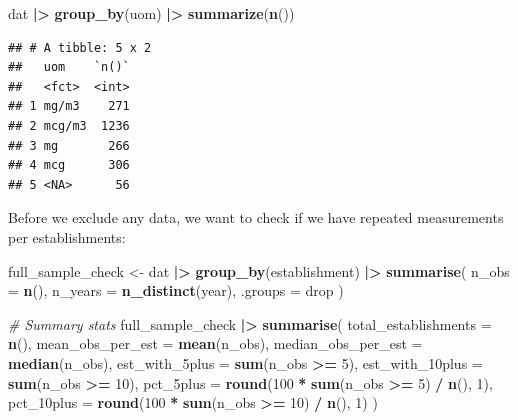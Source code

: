 \documentclass[
]{article}
\newenvironment{Shaded}{\begin{snugshade}}{\end{snugshade}}
\newcommand{\AttributeTok}[1]{\textcolor[rgb]{0.13,0.29,0.53}{#1}}
\newcommand{\CommentTok}[1]{\textcolor[rgb]{0.56,0.35,0.01}{\textit{#1}}}
\newcommand{\DecValTok}[1]{\textcolor[rgb]{0.00,0.00,0.81}{#1}}
\newcommand{\FunctionTok}[1]{\textcolor[rgb]{0.13,0.29,0.53}{\textbf{#1}}}
\newcommand{\NormalTok}[1]{#1}
\newcommand{\OtherTok}[1]{\textcolor[rgb]{0.56,0.35,0.01}{#1}}
\newcommand{\SpecialCharTok}[1]{\textcolor[rgb]{0.81,0.36,0.00}{\textbf{#1}}}
\newcommand{\StringTok}[1]{\textcolor[rgb]{0.31,0.60,0.02}{#1}}
\begin{document}
\begin{Shaded}
\begin{Highlighting}[]
\NormalTok{dat }\SpecialCharTok{|\textgreater{}} 
  \FunctionTok{group\_by}\NormalTok{(uom) }\SpecialCharTok{|\textgreater{}} 
  \FunctionTok{summarize}\NormalTok{(}\FunctionTok{n}\NormalTok{())}
\end{Highlighting}
\end{Shaded}

\begin{verbatim}
## # A tibble: 5 x 2
##   uom    `n()`
##   <fct>  <int>
## 1 mg/m3    271
## 2 mcg/m3  1236
## 3 mg       266
## 4 mcg      306
## 5 <NA>      56
\end{verbatim}

Before we exclude any data, we want to check if we have repeated
measurements per establishments:

\begin{Shaded}
\begin{Highlighting}[]
\NormalTok{ full\_sample\_check }\OtherTok{\textless{}{-}}\NormalTok{ dat }\SpecialCharTok{|\textgreater{}}
  \FunctionTok{group\_by}\NormalTok{(establishment) }\SpecialCharTok{|\textgreater{}}
  \FunctionTok{summarise}\NormalTok{(}
    \AttributeTok{n\_obs =} \FunctionTok{n}\NormalTok{(),}
    \AttributeTok{n\_years =} \FunctionTok{n\_distinct}\NormalTok{(year),}
    \AttributeTok{.groups =} \StringTok{\textquotesingle{}drop\textquotesingle{}}
\NormalTok{  )}

\CommentTok{\# Summary stats}
\NormalTok{full\_sample\_check }\SpecialCharTok{|\textgreater{}}
  \FunctionTok{summarise}\NormalTok{(}
    \AttributeTok{total\_establishments =} \FunctionTok{n}\NormalTok{(),}
    \AttributeTok{mean\_obs\_per\_est =} \FunctionTok{mean}\NormalTok{(n\_obs),}
    \AttributeTok{median\_obs\_per\_est =} \FunctionTok{median}\NormalTok{(n\_obs),}
    \AttributeTok{est\_with\_5plus =} \FunctionTok{sum}\NormalTok{(n\_obs }\SpecialCharTok{\textgreater{}=} \DecValTok{5}\NormalTok{),}
    \AttributeTok{est\_with\_10plus =} \FunctionTok{sum}\NormalTok{(n\_obs }\SpecialCharTok{\textgreater{}=} \DecValTok{10}\NormalTok{),}
    \AttributeTok{pct\_5plus =} \FunctionTok{round}\NormalTok{(}\DecValTok{100} \SpecialCharTok{*} \FunctionTok{sum}\NormalTok{(n\_obs }\SpecialCharTok{\textgreater{}=} \DecValTok{5}\NormalTok{) }\SpecialCharTok{/} \FunctionTok{n}\NormalTok{(), }\DecValTok{1}\NormalTok{),}
    \AttributeTok{pct\_10plus =} \FunctionTok{round}\NormalTok{(}\DecValTok{100} \SpecialCharTok{*} \FunctionTok{sum}\NormalTok{(n\_obs }\SpecialCharTok{\textgreater{}=} \DecValTok{10}\NormalTok{) }\SpecialCharTok{/} \FunctionTok{n}\NormalTok{(), }\DecValTok{1}\NormalTok{)}
\NormalTok{  )  }
\end{Highlighting}
\end{Shaded}
\end{document}
